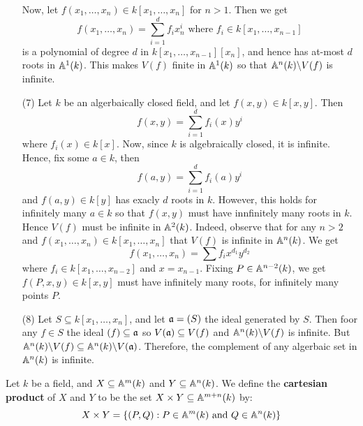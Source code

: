 \begin{example}
\begin{enumerate}
      Now, let $f(x_1, \dots, x_n) \in k[x_1, \dots, x_n]$ for $n>1$.
      Then we get
      \begin{equation*}
        f(x_1, \dots, x_n)=\sum_{i=1}^d{f_ix_n^i} \text{ where }
        f_i \in k[x_1, \dots, x_{n-1}]
      \end{equation*}
      is a polynomial of degree $d$ in $k[x_1, \dots, x_{n-1}][x_n]$,
      and hence has at-most $d$ roots in $\A^1(k)$. This makes $V(f)$
      finite in $\A^1(k)$ so that $\com{\A^n(k)}{V(f)}$ is infinite.

    \item[(7)] Let $k$ be an algerbaically closed field, and let
      $f(x,y) \in k[x,y]$. Then
      \begin{equation*}
        f(x,y)=\sum_{i=1}^d{f_i(x)y^i}
      \end{equation*}
      where $f_i(x) \in k[x]$. Now, since $k$ is algebraically closed,
      it is infinite. Hence, fix some $a \in k$, then
      \begin{equation*}
        f(a,y)=\sum_{i=1}^d{f_i(a)y^i}
      \end{equation*}
      and $f(a,y) \in k[y]$ has exacly $d$ roots in $k$. However, this
      holds for infinitely many $a \in k$ so that $f(x,y)$ must have
      innfinitely many roots in $k$. Hence $V(f)$ must be infinite in
      $\mathbb{A}^2(k)$. Indeed, observe that for any $n>2$ and $f(x_1, \dots,
      x_n) \in k[x_1, \dots, x_n]$ that $V(f)$ is infinite in
      $\mathbb{A}^n(k)$. We get
      \begin{equation*}
        f(x_1, \dots, x_n)=\sum{f_ix^{d_1}y^{d_2}}
      \end{equation*}
      where $f_i \in k[x_1, \dots, x_{n-2}]$ and $x=x_{n-1}$. Fixing
      $P \in \mathbb{A}^{n-2}(k)$, we get $f(P,x,y) \in k[x,y]$ must have
      infinitely many roots, for infinitely many points $P$.

    \item[(8)] Let $S \subseteq k[x_1, \dots, x_n]$, and let $\mathfrak{a}=(S)$
      the ideal generated by $S$. Then foor any $f \in S$ the ideal
      $(f) \subseteq \mathfrak{a}$ so $V(\mathfrak{a}) \subseteq V(f)$ and
      $\com{\A^n(k)}{V(f)}$ is infinite. But $\mathbb{A}^n(k) \backslash V(f)
      \subseteq \mathbb{A}^n(k) \backslash V(\mathfrak{a})$. Therefore, the complement of
      any algerbaic set in $\mathbb{A}^n(k)$ is infinite.
  \end{enumerate}
\end{example}

\begin{defintion}
  Let $k$ be a field, and $X \subseteq \mathbb{A}^m(k)$ and $Y \subseteq
  \mathbb{A}^n(k)$. We define the \textbf{cartesian product} of
  $X$ and $Y$ to be the set $X \times Y \subseteq \mathbb{A}^{m+n}(k)$ by:
  \begin{equation*}
    X \times Y=\{(P,Q) : P \in \mathbb{A}^m(k) \text{ and } Q \in \mathbb{A}^n(k)\}
  \end{equation*}
\end{defintion}

